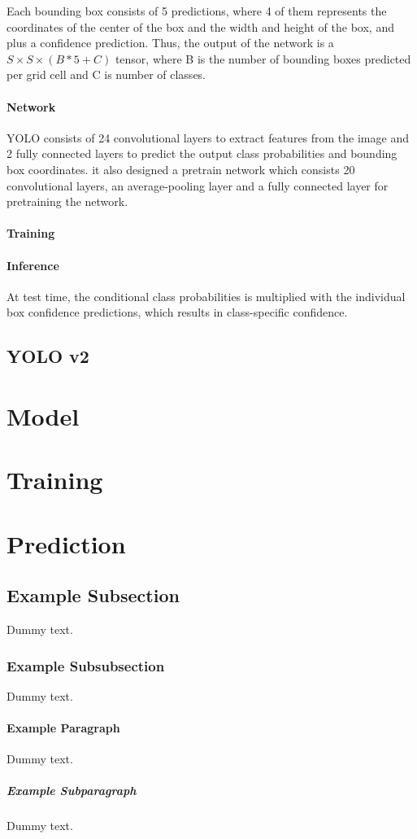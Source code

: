 Each bounding box consists of 5 predictions, where 4 of them represents the coordinates of the center of the box and the width and height of the box, and plus a confidence prediction. Thus, the output of the network is a $S \times S \times (B * 5 + C)$ tensor, where B is the number of bounding boxes predicted per grid cell and C is number of classes.

\paragraph{Network}
YOLO consists of 24 convolutional layers to extract features from the image and 2 fully connected layers to predict the output class probabilities and bounding box coordinates. it also designed a pretrain network which consists 20 convolutional layers, an average-pooling layer and a fully connected layer for pretraining the network.

\paragraph{Training}




\paragraph{Inference}
At test time, the conditional class probabilities is multiplied with the individual box confidence predictions, which results in class-specific confidence.

\subsection{YOLO v2}

\section{Model}
\section{Training}
\section{Prediction}




\subsection{Example Subsection}

Dummy text.

\subsubsection{Example Subsubsection}

Dummy text.

\paragraph{Example Paragraph}

Dummy text.

\subparagraph{Example Subparagraph}

Dummy text.
